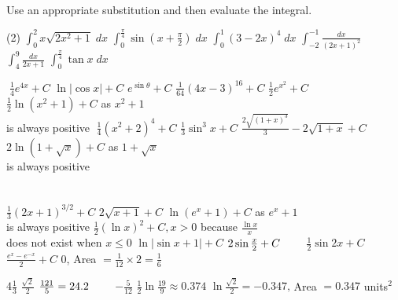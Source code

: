 \begin{Exercise}[title={Integration by Substitution},label=exIBS]
\Question Use an appropriate substitution and then evaluate the integral.
	\begin{tasks}(2)
	\task  $\int _{0}^{2}x \sqrt{2 x^{2} +1}\; d x$ %
	\task $\int _{0}^{\frac{\pi }{4}}\sin  \left (x +\frac{\pi }{2}\right )\; d x$ %
	\task $\int _{0}^{1}\left (3 -2 x\right )^{4}\; d x$ %
	\task $\int _{ -2}^{ -1}\frac{d x}{\left (2 x +1\right )^{2}}$ %
	\task $\int _{4}^{9}\frac{d x}{2 x +1}$ %
	\task $\int _{0}^{\frac{\pi }{4}}\tan  x\; d x$ %
\end{tasks}
\end{Exercise}
\begin{Answer}[ref={exIBS}]

\Question %
\begin{tasks}
	\task  $\;\frac{1}{4} e^{4 x} +C$ 
	\task $\ln  \left \vert \cos  x\right \vert  +C$ 
	\task $e^{\sin  \theta } +C$ 
	\task $\frac{1}{64} \left (4 x -3\right )^{16} +C$ 
	\task $\frac{1}{2} e^{x^{2}} +C$ 
	\task $\frac{1}{2} \ln  \left (x^{2} +1\right ) +C$ as $x^{2} +1$ \\is always positive 
	\task $\;\frac{1}{4} \left (x^{2} +2\right )^{4} +C$
	\task $\frac{1}{3} \sin ^{3} x +C$ 
	\task $\frac{2 \sqrt{\left (1 +x\right )^{3}}}{3} -2 \sqrt{1 +x} +C$ 
	\task $2 \ln  \left (1 +\sqrt{x}\right ) +C$ as $1 +\sqrt{x}$ \\is always positive 
\end{tasks}
$\phantom{1}$\\
\Question %
\begin{tasks}
	\task $\frac{1}{3} \left (2 x +1\right )^{3/2} +C$ 
	\task $2 \sqrt{x +1} +C$ 
	\task $\ln  \left (e^{x} +1\right ) +C$ as $e^{x} +1$ \\is always positive 
	\task $\frac{1}{2} \left (\ln  x\right )^{2} +C ,x >0$ because $\frac{\ln  x}{x}$ \\
	does not exist when $x \leq 0$ 
	\task $\ln  \left \vert \sin  x +1\right \vert  +C$
	\task $2 \sin  \frac{x}{2} +C\text{\quad \quad }$
	\task $\frac{1}{2} \sin  2 x +C$ 
	\task $\frac{e^{x} -e^{ -x}}{2} +C$
	\task $0$, Area $ =\frac{1}{12} \times 2 =\frac{1}{6}$
\end{tasks}

\Question %
\begin{tasks}
	\task $4\frac{1}{3}$
	\task $\frac{\sqrt{2}}{2}$ 
	\task $\frac{121}{5} =24.2\text{\quad \quad }$
	\task $ -\frac{5}{12}$ 
	\task $\frac{1}{2} \ln  \frac{19}{9} \approx 0.374$ 
	\task $\ln  \frac{\sqrt{2}}{2} = -0.347\text{,}$ Area $ =0.347$ units$^2$
\end{tasks}
\end{Answer}%


